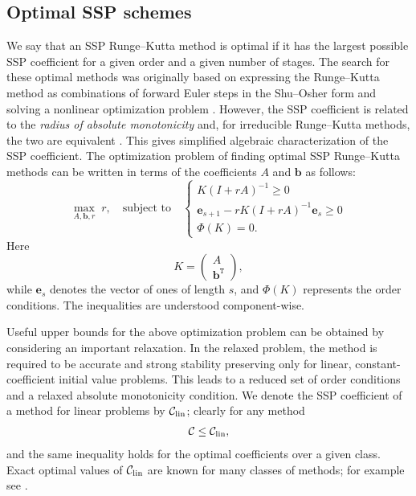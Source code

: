 \subsection{Optimal SSP schemes}\label{subsec:Optimal_SSPRK}
We say that an SSP Runge--Kutta method is optimal if it has the largest 
possible SSP coefficient for a given order and a given number of stages.
The search for these optimal methods was originally based on
expressing the Runge--Kutta method as combinations of forward Euler
steps in the Shu--Osher form and solving a nonlinear optimization
problem \cite{Gottlieb/Shu:1998, Gottlieb2001, Spiteri2003a, Spiteri2003b,
  Ruuth2004, Ruuth:2006}.
However, the SSP coefficient is related to the 
\emph{radius of absolute monotonicity} \cite{Kraaijevanger1991} and, 
for irreducible Runge--Kutta methods, the two are equivalent 
\cite{Ferracina2004, Higueras2004}.
This gives  simplified algebraic characterization of the SSP coefficient. 
\cite{Ferracina2005}
The optimization problem of finding optimal SSP Runge--Kutta methods
can be written in terms of the coefficients $A$ and $\bm{b}$ as
follows:
\begin{equation}\label{eq:SSP_opt}
    \max_{A, \bm{b}, r} \; r, \quad \text{subject to} \quad \left\{
                                                 \begin{array}{ll}
                                                   K(I + rA)^{-1} \geq 0 \\
                                                   \bm{e}_{s+1} - rK(I + rA)^{-1}\bm{e}_{s} \geq 0 \\
                                                   \Phi(K) = 0.
                                                 \end{array}
                                               \right.
\end{equation}
Here
\begin{equation*}
    K = \left(
            \begin{array}{c}
                     A              \\
                     \bm{b}^{\texttt{T}}
            \end{array}
         \right),
\end{equation*}
while $\bm{e}_s$ denotes the vector of ones of length $s$,
and \( \Phi(K) \) represents the  order conditions.
The inequalities are understood component-wise.

Useful upper bounds for the above optimization problem can be obtained 
by considering an important relaxation. 
In the relaxed problem, the method is required to be accurate and strong 
stability preserving only for linear, constant-coefficient initial value problems. 
This leads to a reduced set of order conditions and a relaxed absolute 
monotonicity condition.
We denote the SSP coefficient of a method for linear problems by $\mathcal{C}_{\text{lin}}$; 
clearly for any method
\begin{align*}
	\mathcal{C}\le\mathcal{C}_{\text{lin}},
\end{align*}
and the same inequality holds for the optimal coefficients over a given class.
Exact optimal values of $\mathcal{C}_{\text{lin}}$ are known for many classes of methods; for
example see \cite{Kraaijevanger1986,ketcheson2009a}.

